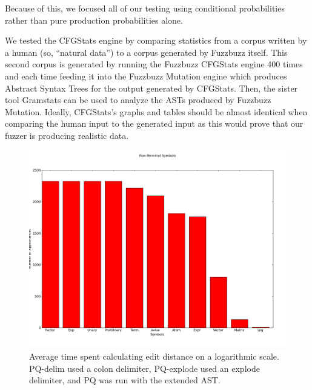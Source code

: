 Because of this, we focused all of our testing using conditional probabilities
rather than pure production probabilities alone.

We tested the CFGStats engine by comparing statistics from a corpus written by
a human (so, ``natural data'') to a corpus generated by Fuzzbuzz itself. This
second corpus is generated by running the Fuzzbuzz CFGStats engine 400 times and
each time feeding it into the Fuzzbuzz Mutation engine which produces Abstract
Syntax Trees for the output generated by CFGStats. Then, the sister tool
Gramstats can be used to analyze the ASTs produced by Fuzzbuzz Mutation.
Ideally, CFGStats's graphs and tables should be almost identical when comparing
the human input to the generated input as this would prove that our fuzzer is
producing realistic data.

\begin{figure}
    \begin{center}
        \includegraphics[scale=0.4]{figs/human/nonterm_histogram.png}
    \end{center}
        \caption{Average time spent calculating edit distance on a
                logarithmic scale. PQ-delim used a colon delimiter, PQ-explode
                used an explode delimiter, and PQ was run with the extended
                AST.}
    \label{times}
\end{figure}


